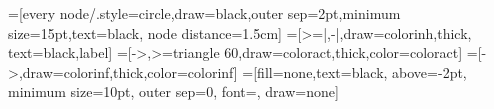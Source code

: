 
\def\levels{\mathsf{niveaux}}
\def\levelsA#1#2{\levels_+(#1\rightarrow #2)}
\def\levelsI#1#2{\levels_-(#1\rightarrow #2)}
\newcommand{\PHres}{\mathsf{Res}}

\newcommand{\Kinconnu}{\emptyset}
\newcommand{\RRGva}[3]{#1 \stackrel{#2}{\longrightarrow} #3}
\newcommand{\RRGgi}{\mathcal{G}}
\newcommand{\RRGreg}[1]{\RRGgi_{#1}}
\newcommand{\RRGres}[2]{\PHres_{#1}(#2)}








=[every node/.style={circle,draw=black,outer sep=2pt,minimum
                size=15pt,text=black}, node distance=1.5cm]
=[>=|,-|,draw=colorinh,thick, text=black,label]
=[->,>=triangle 60,draw=coloract,thick,color=coloract]
=[->,draw=colorinf,thick,color=colorinf]
=[fill=none,text=black, above=-2pt,%
minimum size=10pt, outer sep=0, font=\scriptsize, draw=none]

